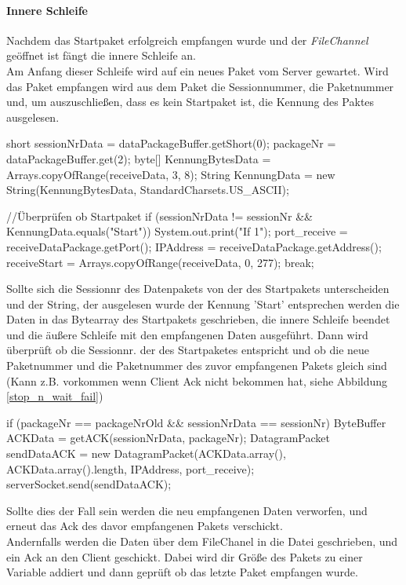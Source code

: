 \documentclass[a4paper, 12pt]{scrartcl}
\begin{document}
\paragraph{Innere Schleife} Nachdem das Startpaket erfolgreich empfangen wurde und der \textit{FileChannel} geöffnet ist fängt die innere Schleife an.\\
Am Anfang dieser Schleife wird auf ein neues Paket vom Server gewartet. Wird das Paket empfangen wird aus dem Paket die Sessionnummer, die Paketnummer und, um auszuschließen, dass es kein Startpaket ist, die Kennung des Paktes ausgelesen. 
\begin{javacode}
short sessionNrData = dataPackageBuffer.getShort(0);
packageNr = dataPackageBuffer.get(2);
byte[] KennungBytesData = Arrays.copyOfRange(receiveData, 3, 8);
String KennungData = new String(KennungBytesData, StandardCharsets.US_ASCII);
	            	  
//Überprüfen ob Startpaket
if (sessionNrData != sessionNr && KennungData.equals("Start"))
{
	System.out.print("If 1\n");
	port_receive = receiveDataPackage.getPort();
	IPAddress = receiveDataPackage.getAddress();
	receiveStart = Arrays.copyOfRange(receiveData, 0, 277); 
	break;
}
\end{javacode}
Sollte sich die Sessionnr des Datenpakets von der des Startpakets unterscheiden und der String, der ausgelesen wurde der Kennung 'Start' entsprechen werden die Daten in das Bytearray des Startpakets geschrieben, die innere Schleife beendet und die äußere Schleife mit den empfangenen Daten ausgeführt.
Dann wird überprüft ob die Sessionnr. der des Startpaketes entspricht und ob die neue Paketnummer und die Paketnummer des zuvor empfangenen Pakets gleich sind (Kann z.B. vorkommen wenn Client Ack nicht bekommen hat, siehe Abbildung \ref{stop_n_wait_fail})
\begin{javacode}
if (packageNr == packageNrOld && sessionNrData == sessionNr)
{
	ByteBuffer ACKData = getACK(sessionNrData, packageNr);
	DatagramPacket sendDataACK = 
		new DatagramPacket(ACKData.array(), 
		ACKData.array().length, IPAddress, port_receive);      
	serverSocket.send(sendDataACK);     
}
\end{javacode}
Sollte dies der Fall sein werden die neu empfangenen Daten verworfen, und erneut das Ack des davor empfangenen Pakets verschickt.\\
Andernfalls werden die Daten über dem FileChanel in die Datei geschrieben, und ein Ack an den Client geschickt. Dabei wird dir Größe des Pakets zu einer Variable addiert und dann geprüft ob das letzte Paket empfangen wurde.
\end{document}
